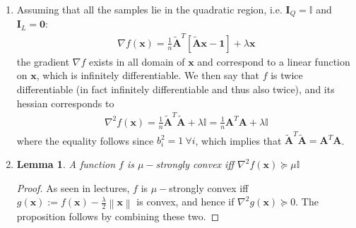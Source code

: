 \documentclass[letterpaper]{article}
\providecommand{\xx}{\mathbf{x}}
\providecommand{\1}{\mathbf{1}}
\providecommand{\0}{\mathbf{0}}
\providecommand{\mA}{\mathbf{A}}
\providecommand{\mI}{\mathbf{I}}
\providecommand{\norm}[1]{\ensuremath{\left\lVert#1\right\rVert}}
\newtheorem{lemma}{Lemma}
\begin{document}
\begin{enumerate}[label=(\alph*)]
    Using the fact that $\lambda\mathbf{I} + \frac{1}{n}\tilde{\mA}^T \mI_Q \tilde{\mA} = \lambda\mathbf{I} + \frac{1}{n}\tilde{\mA}^T \tilde{\mA}$ given in the problem statement and using the triangle inequality, we get that
    \begin{align}
        \norm{\lambda\mathbf{I} + \frac{1}{n}\tilde{\mA}^T \mI_Q \tilde{\mA}} &:= \max_{\xx:\norm{\xx}=1} \norm{\left( \lambda\mathbf{I} + \frac{1}{n}\tilde{\mA}^T\mI_Q  \tilde{\mA} \right) \xx} \leq |\lambda| \max_{\xx:\norm{\xx}=1} \norm{\xx}  +\frac{1}{n} \max_{\xx:\norm{\xx}=1}  \norm{\tilde{\mA}^T \mI_Q \tilde{\mA}\xx} \\
        &:= \lambda + \frac{1}{n}\norm{\tilde{\mA}^T \tilde{\mA}} \leq \lambda + \frac{1}{n}\norm{\tilde{\mA}^T} \norm{\tilde{\mA}}
    \end{align}
    where the last inequality again follows from definition of the spectral norm and I assume that $\lambda$ is non-negative. The proof is completed using the fact that $\norm{\tilde{\mA}}=\norm{\mA}$ and $\norm{\tilde{\mA}^T}=\norm{\mA^T}$.
    
    \item Assuming that all the samples lie in the quadratic region, i.e. $\mI_Q = \mathbb{I}$ and $\mI_L=\0$:
    \begin{align}
        \nabla f(\xx) = \frac{1}{n} \tilde{\mA}^T [\tilde{\mA} \xx - \1] + \lambda \xx
    \end{align}
    the gradient $\nabla f$ exists in all domain of $\xx$ and correspond to a linear function on $\xx$, which is infinitely differentiable. We then say that $f$ is twice differentiable (in fact infinitely differentiable and thus also twice), and its hessian corresponds to
    \begin{align}
        \nabla^2 f(\xx) = \frac{1}{n} \tilde{\mA}^T \tilde{\mA} + \lambda\mathbb{I}=\frac{1}{n}\mA^T \mA + \lambda\mathbb{I}
    \end{align}
    where the equality follows since $b_i^2 = 1 \ \forall i$, which implies that $\tilde{\mA}^T \tilde{\mA} = \mA^T \mA$.
    
    \item 
    \begin{lemma}
        A function $f$ is $\mu-$strongly convex iff $\nabla^2 f(\xx) \succeq \mu \mathbb{I}$
        \label{prop:1}
    \end{lemma}
    \begin{proof}
        As seen in lectures, $f$ is $\mu-$strongly convex iff $g(\xx):=f(\xx)-\frac{\lambda}{2}\norm{\xx}$ is convex, and hence if $\nabla^2g(\xx) \succeq 0$. The proposition follows by combining these two.
    \end{proof}
    

\end{enumerate}
\end{document}
